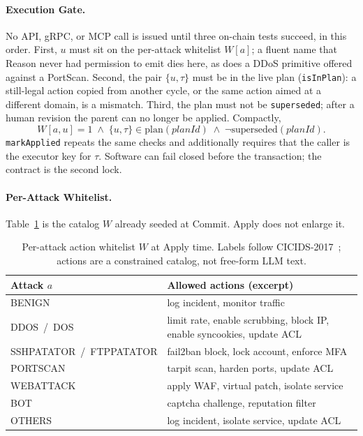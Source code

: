 \documentclass[10pt, conference]{IEEEtran}
\begin{document}
\paragraph{Execution Gate.}
No API, gRPC, or MCP call is issued until three on-chain tests succeed, in this order. First, $u$ must sit on the per-attack whitelist $W[a]$; a fluent name that Reason never had permission to emit dies here, as does a DDoS primitive offered against a PortScan. Second, the pair $\{u,\tau\}$ must be in the live plan (\texttt{isInPlan}): a still-legal action copied from another cycle, or the same action aimed at a different domain, is a mismatch. Third, the plan must not be \texttt{superseded}; after a human revision the parent can no longer be applied. Compactly,
\begin{equation}
W[a,u]=1 \;\wedge\; \{u,\tau\}\in\mathrm{plan}(\mathit{planId}) \;\wedge\; \neg\mathrm{superseded}(\mathit{planId}).
\label{eq:apply-gate}
\end{equation}
\texttt{markApplied} repeats the same checks and additionally requires that the caller is the executor key for $\tau$. Software can fail closed before the transaction; the contract is the second lock.

\paragraph{Per-Attack Whitelist.}
Table~\ref{tab:whitelist} is the catalog $W$ already seeded at Commit. Apply does not enlarge it.

\begin{table}[t]
\caption{Per-attack action whitelist $W$ at Apply time. Labels follow CICIDS-2017~\cite{sharafaldin2018}; actions are a constrained catalog, not free-form LLM text.}
\label{tab:whitelist}
\centering
\begin{tabular}{p{}p{}}
\hline
Attack $a$ & Allowed actions (excerpt) \\
\hline
BENIGN & log incident, monitor traffic \\
DDOS~/~DOS & limit rate, enable scrubbing, block IP, enable syncookies, update ACL \\
SSHPATATOR~/~FTPPATATOR & fail2ban block, lock account, enforce MFA \\
PORTSCAN & tarpit scan, harden ports, update ACL \\
WEBATTACK & apply WAF, virtual patch, isolate service \\
BOT & captcha challenge, reputation filter \\
OTHERS & log incident, isolate service, update ACL \\
\hline
\end{tabular}
\end{table}
\end{document}
